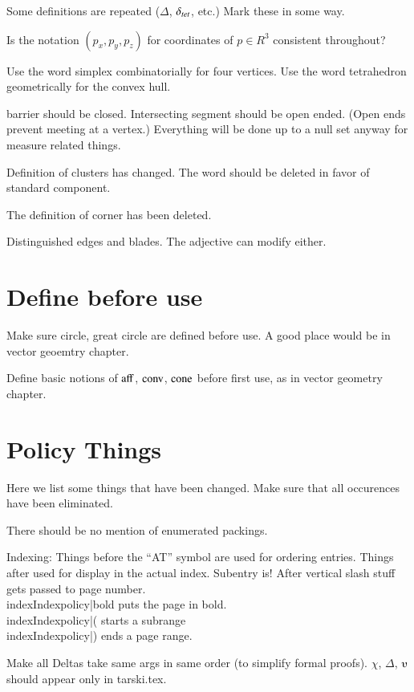 Some definitions are repeated ($\Delta$, $\delta_{tet}$, etc.)
Mark these in some way.

Is the notation $(p_x,p_y,p_z)$ for coordinates 
of $p\in R^3$ consistent throughout?

Use the word simplex combinatorially for four vertices.
Use the word tetrahedron geometrically for the convex hull.

barrier should be closed. Intersecting segment should be open ended.
(Open ends prevent meeting at a vertex.)
Everything will be done up to a null set
anyway for measure related things.

Definition of clusters has changed.  The word should be deleted
in favor of standard component.  

The definition of corner has been deleted.

Distinguished edges and blades.  The adjective can modify either.




\section{Define before use}

Make sure circle, great circle are defined before use.
A good place would be in vector geoemtry chapter.

Define basic notions of ${\operatorname{aff}}$, ${\operatorname{conv}}$, ${\operatorname{cone}}$
before first use, as in vector geometry chapter.


\section{Policy Things}

Here we list some things that have been changed.  Make sure that
all occurences have been eliminated.

There should be no mention of enumerated packings.

Indexing: Things before the ``AT'' symbol are used for ordering entries.
Things after used for display in the actual index.
Subentry is!  After vertical slash stuff gets passed to page
number.  \\index{Index}{policy|bold}  puts the page in bold.
\\index{Index}{policy|(} starts a subrange \\index{Index}{policy|)} ends a page range.

Make all Deltas take same args in same order (to simplify formal proofs).
$\chi$, $\Delta$, $\ups$ should appear only in tarski.tex. 

